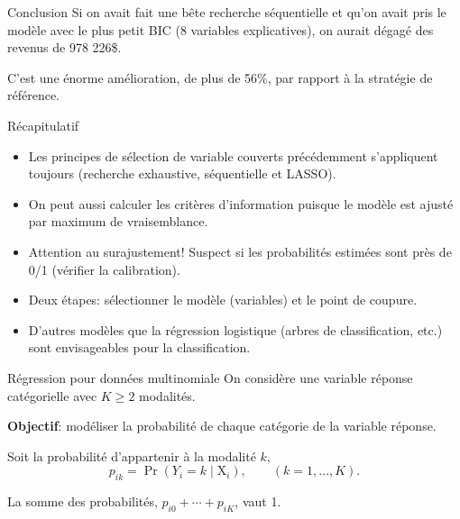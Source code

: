 \documentclass[
  ignorenonframetext,
]{beamer}
\providecommand{\tightlist}{%
  \setlength{\itemsep}{0pt}\setlength{\parskip}{0pt}}\usepackage{longtable,booktabs,array}
\begin{document}
\begin{frame}{Conclusion}
\protect\hypertarget{conclusion}{}
Si on avait fait une bête recherche séquentielle et qu'on avait pris le
modèle avec le plus petit BIC (8 variables explicatives), on aurait
dégagé des revenus de 978 226\$.

C'est une énorme amélioration, de plus de 56\%, par rapport à la
stratégie de référence.
\end{frame}

\begin{frame}{Récapitulatif}
\protect\hypertarget{ruxe9capitulatif}{}
\begin{itemize}
\tightlist
\item
  Les principes de sélection de variable couverts précédemment
  s'appliquent toujours (recherche exhaustive, séquentielle et LASSO).
\item
  On peut aussi calculer les critères d'information puisque le modèle
  est ajusté par maximum de vraisemblance.
\item
  Attention au surajustement! Suspect si les probabilités estimées sont
  près de 0/1 (vérifier la calibration).
\item
  Deux étapes: sélectionner le modèle (variables) et le point de
  coupure.
\item
  D'autres modèles que la régression logistique (arbres de
  classification, etc.) sont envisageables pour la classification.
\end{itemize}
\end{frame}

\begin{frame}{Régression pour données multinomiale}
\protect\hypertarget{ruxe9gression-pour-donnuxe9es-multinomiale}{}
On considère une variable réponse catégorielle avec \(K \ge 2\)
modalités.

\textbf{Objectif}: modéliser la probabilité de chaque catégorie de la
variable réponse.

Soit la probabilité d'appartenir à la modalité \(k\),
\[p_{ik} = \Pr(Y_i=k \mid \mathrm{X}_i), \qquad (k=1, \ldots, K).\]

La somme des probabilités, \(p_{i0} + \cdots + p_{iK}\), vaut 1.
\end{frame}
\end{document}
